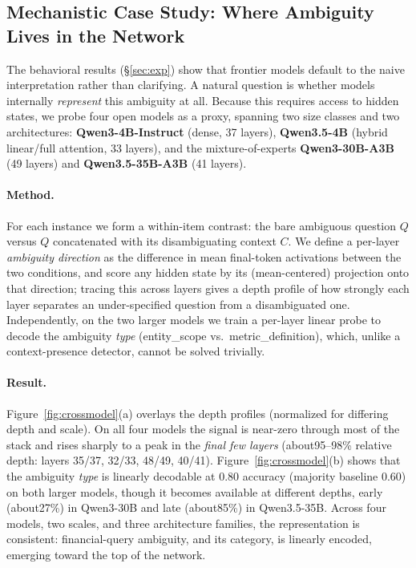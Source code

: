 \subsection{Mechanistic Case Study: Where Ambiguity Lives in the Network}
\label{sec:mechanistic}

The behavioral results (\S\ref{sec:exp}) show that frontier models default to the naive
interpretation rather than clarifying. A natural question is whether models internally
\emph{represent} this ambiguity at all. Because this requires access to hidden states, we probe
four open models as a proxy, spanning two size classes and two architectures:
\textbf{Qwen3-4B-Instruct} (dense, 37 layers), \textbf{Qwen3.5-4B} (hybrid linear/full attention,
33 layers), and the mixture-of-experts \textbf{Qwen3-30B-A3B} (49 layers) and
\textbf{Qwen3.5-35B-A3B} (41 layers).

\paragraph{Method.} For each instance we form a within-item contrast: the bare ambiguous
question $Q$ versus $Q$ concatenated with its disambiguating context $C$. We define a per-layer
\emph{ambiguity direction} as the difference in mean final-token activations between the two
conditions, and score any hidden state by its (mean-centered) projection onto that direction;
tracing this across layers gives a depth profile of how strongly each layer separates an
under-specified question from a disambiguated one. Independently, on the two larger models we
train a per-layer linear probe to decode the ambiguity \emph{type} (entity\_scope vs.\
metric\_definition), which, unlike a context-presence detector, cannot be solved trivially.

\paragraph{Result.} Figure~\ref{fig:crossmodel}(a) overlays the depth profiles (normalized for
differing depth and scale). On all four models the signal is near-zero through most of the stack
and rises sharply to a peak in the \emph{final few layers} (about95--98\% relative depth:
layers 35/37, 32/33, 48/49, 40/41). Figure~\ref{fig:crossmodel}(b) shows that the ambiguity
\emph{type} is linearly decodable at 0.80 accuracy (majority baseline 0.60) on both larger
models, though it becomes available at different depths, early (about27\%) in Qwen3-30B and
late (about85\%) in Qwen3.5-35B. Across four models, two scales, and three architecture
families, the representation is consistent: financial-query ambiguity, and its category, is linearly
encoded, emerging toward the top of the network.

